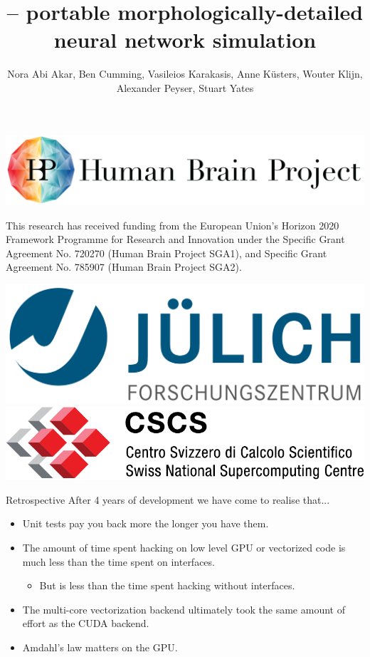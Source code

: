\documentclass[aspectratio=43]{beamer}
\author{Nora Abi Akar, Ben Cumming, Vasileios Karakasis, Anne Küsters, Wouter Klijn, Alexander Peyser, Stuart Yates}
\title{\arbor{} -- portable morphologically-detailed neural network simulation}
\subtitle{CNS*2020 Workshop \emph{Tools and resources for developing and sharing models in computational neuroscience} \date{} }
\begin{document}
\cscstitle

\begin{frame}[fragile]{}
    \begin{center}
        \includegraphics[height=0.15\textwidth]{logos/HBP_logo.jpg}
        \\ \vfill

        This research has received funding from the European Union’s Horizon 2020 Framework Programme for Research
        and Innovation under the Specific Grant Agreement No.  720270 (Human Brain Project SGA1), and Specific Grant
        Agreement No. 785907 (Human Brain Project SGA2).
        \\ \vfill

        \includegraphics[height=0.1\textwidth]{logos/julich_logo.pdf}
        \hspace{1cm}
        \includegraphics[height=0.09\textwidth]{logos/cscs_logo.pdf}
    \end{center}

\end{frame}

%


\begin{frame}[fragile]{Retrospective}
    After 4 years of development we have come to realise that...
    \begin{itemize}
        \item Unit tests pay you back more the longer you have them.
        \item The amount of time spent hacking on low level GPU or vectorized code is much less than the time spent on interfaces.
        \begin{itemize}
            \item But is less than the time spent hacking without interfaces.
        \end{itemize}
        \item The multi-core vectorization backend ultimately took the same amount of effort as the CUDA backend.
        \item Amdahl's law matters on the GPU.
    \end{itemize}
\end{frame}
\end{document}
